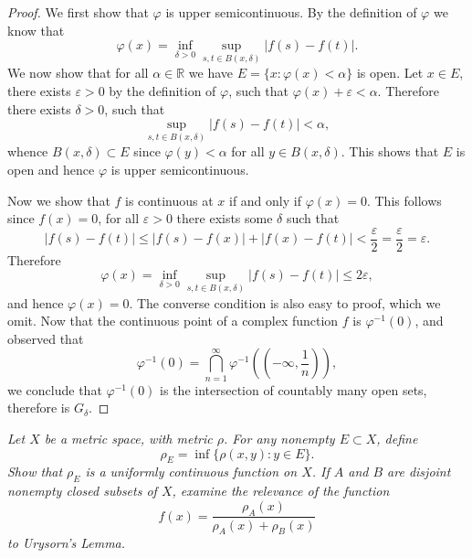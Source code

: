 \begin{proof}
We first show that $\varphi$ is upper semicontinuous. By the definition of $\varphi$ we know that 
$$
\varphi \left( x \right) =\mathop {\mathrm{inf}} \limits_{\delta >0}\mathop {\mathrm{sup}} \limits_{s,t\in B\left( x,\delta \right)}\left| f\left( s \right) -f\left( t \right) \right|.
$$
We now show that for all $\alpha\in\mathbb{R}$ we have $E=\{x:\varphi(x)<\alpha\}$ is open. Let $x\in E$, there exists $\varepsilon>0$ by the definition of $\varphi$, such that $\varphi(x)+\varepsilon<\alpha$. Therefore there exists $\delta>0$, such that 
$$
\mathop {\mathrm{sup}} \limits_{s,t\in B\left( x,\delta \right)}\left| f\left( s \right) -f\left( t \right) \right|<\alpha ,
$$
whence $B(x,\delta)\subset E$ since $\varphi(y)<\alpha$ for all $y\in B(x,\delta)$. This shows that $E$ is open and hence $\varphi$ is upper semicontinuous.\par
Now we show that $f$ is continuous at $x$ if and only if $\varphi(x)=0$. This follows since $f(x)=0$, for all $\varepsilon>0$ there exists some $\delta$ such that 
$$|f(s)-f(t)|\le|f(s)-f(x)|+|f(x)-f(t)|<\frac{\varepsilon}{2}=\frac{\varepsilon}{2}=\varepsilon.$$
Therefore 
$$
\varphi \left( x \right) =\mathop {\mathrm{inf}} \limits_{\delta >0}\mathop {\mathrm{sup}} \limits_{s,t\in B\left( x,\delta \right)}\left| f\left( s \right) -f\left( t \right) \right|\le 2\varepsilon ,
$$
and hence $\varphi(x)=0$. The converse condition is also easy to proof, which we omit. Now that the continuous point of a complex function $f$ is $\varphi^{-1}(0)$, and observed that 
$$
\varphi ^{-1}\left( 0 \right) =\bigcap_{n=1}^{\infty}{\varphi ^{-1}\left( \left( -\infty ,\frac{1}{n} \right) \right)},
$$
we conclude that $\varphi^{-1}(0)$ is the intersection of countably many open sets, therefore is $G_\delta$.
\end{proof}
\begin{problem}\em
Let $X$ be a metric space, with metric $\rho$. For any nonempty $E\subset X$, define 
$$\rho_E=\inf\{\rho(x,y):y\in E\}.$$
Show that $\rho_E$ is a uniformly continuous function on $X$. If $A$ and $B$ are disjoint nonempty closed subsets of $X$, examine the relevance of the function 
$$f(x)=\frac{\rho_A(x)}{\rho_A(x)+\rho_B(x)}$$
to Urysorn's Lemma.
\end{problem}
